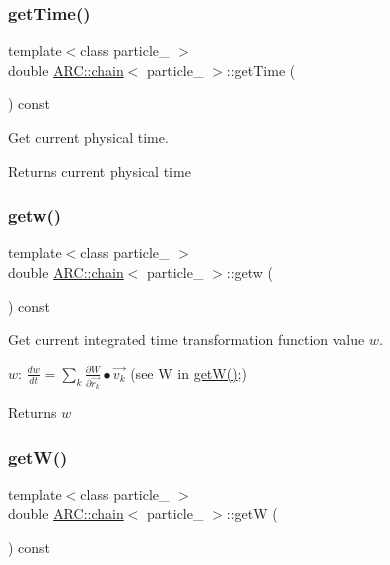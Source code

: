 \subsubsection{\texorpdfstring{get\+Time()}{getTime()}}
{\footnotesize\ttfamily template$<$class particle\+\_\+ $>$ \\
double \hyperlink{classARC_1_1chain}{A\+R\+C\+::chain}$<$ particle\+\_\+ $>$\+::get\+Time (\begin{DoxyParamCaption}{ }\end{DoxyParamCaption}) const\hspace{0.3cm}{\ttfamily [inline]}}



Get current physical time. 

\begin{DoxyReturn}{Returns}
current physical time 
\end{DoxyReturn}
\hypertarget{classARC_1_1chain_a77c4c630698faa32f9f37cb5a14dc53f}{}\label{classARC_1_1chain_a77c4c630698faa32f9f37cb5a14dc53f} 
\subsubsection{\texorpdfstring{getw()}{getw()}}
{\footnotesize\ttfamily template$<$class particle\+\_\+ $>$ \\
double \hyperlink{classARC_1_1chain}{A\+R\+C\+::chain}$<$ particle\+\_\+ $>$\+::getw (\begin{DoxyParamCaption}{ }\end{DoxyParamCaption}) const\hspace{0.3cm}{\ttfamily [inline]}}



Get current integrated time transformation function value $w$. 

$w$\+: $ \frac{dw}{dt} = \sum_k \frac{\partial W}{\partial \vec{r_k}} \bullet \vec{v_k} $ (see W in \hyperlink{classARC_1_1chain_add329711458ff60b5a4a1ce5adaa6a31}{get\+W()};) \begin{DoxyReturn}{Returns}
$w$ 
\end{DoxyReturn}
\hypertarget{classARC_1_1chain_add329711458ff60b5a4a1ce5adaa6a31}{}\label{classARC_1_1chain_add329711458ff60b5a4a1ce5adaa6a31} 
\subsubsection{\texorpdfstring{get\+W()}{getW()}}
{\footnotesize\ttfamily template$<$class particle\+\_\+ $>$ \\
double \hyperlink{classARC_1_1chain}{A\+R\+C\+::chain}$<$ particle\+\_\+ $>$\+::getW (\begin{DoxyParamCaption}{ }\end{DoxyParamCaption}) const\hspace{0.3cm}{\ttfamily [inline]}}



